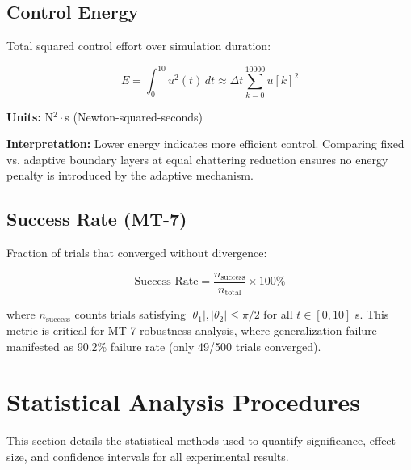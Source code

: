 \subsection{Control Energy}
\label{subsec:control_energy_metric}

Total squared control effort over simulation duration:

\begin{equation}
\label{eq:control_energy_formula}
E = \int_0^{10} u^2(t) \, dt \approx \Delta t \sum_{k=0}^{10000} u[k]^2
\end{equation}

\textbf{Units:} N$^2 \cdot$s (Newton-squared-seconds)

\textbf{Interpretation:} Lower energy indicates more efficient control. Comparing fixed vs. adaptive boundary layers at equal chattering reduction ensures no energy penalty is introduced by the adaptive mechanism.

\subsection{Success Rate (MT-7)}
\label{subsec:success_rate_metric}

Fraction of trials that converged without divergence:

\begin{equation}
\label{eq:success_rate_formula}
\text{Success Rate} = \frac{n_{\text{success}}}{n_{\text{total}}} \times 100\%
\end{equation}

where $n_{\text{success}}$ counts trials satisfying $|\theta_1|, |\theta_2| \leq \pi/2$ for all $t \in [0, 10]$ s. This metric is critical for MT-7 robustness analysis, where generalization failure manifested as 90.2\% failure rate (only 49/500 trials converged).

\section{Statistical Analysis Procedures}
\label{sec:statistical_procedures}

This section details the statistical methods used to quantify significance, effect size, and confidence intervals for all experimental results.

